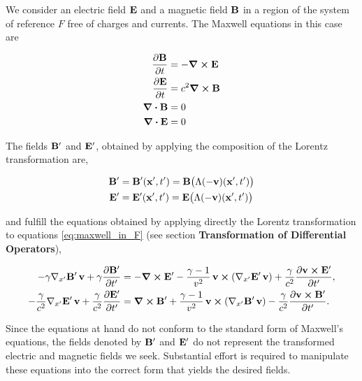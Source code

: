 \documentclass[12pt]{article}
\begin{document}
We consider an electric field $\vb{E}$ and a magnetic field $\vb{B}$ in a region of the
system of reference $F$ free of charges and currents. The Maxwell equations in this case are

\begin{equation}
    \begin{aligned}
      \pdv{\vb{B}}{t} &= -\curl \vb{E} \\
      \pdv{\vb{E}}{t} &= c^2 \curl \vb{B} \\
      \div \vb{B}     &= 0 \\
      \div \vb{E}     &= 0
    \end{aligned}
  \label{eq:maxwell_in_F}
\end{equation}

The fields $\vb{B}'$ and $\vb{E}'$, obtained by applying the composition of the Lorentz
transformation are,

\begin{align}
  \vb{B}' &= \vb{B}'(\vb{x}',t') = \vb{B}\bigl(\Lambda(-\vb{v})(\vb{x}',t')\bigr) \\
  \vb{E}' &= \vb{E}'(\vb{x}',t') = \vb{E}\bigl(\Lambda(-\vb{v})(\vb{x}',t')\bigr)
\end{align}

and fulfill the equations obtained by applying directly the Lorentz transformation to
equations \eqref{eq:maxwell_in_F} (see section \textbf{Transformation of Differential
Operators}),

\begin{equation}
  \begin{aligned}
    -\gamma\nabla_{x'}\vb{B}'\,\vb{v}
    + \gamma\pdv{\vb{B}'}{t'}
    &=
    -\curl \vb{E}'
    - \frac{\gamma-1}{v^2}\,
      \vb{v}\cross\left(\nabla_{x'}\vb{E}'\,\vb{v}\right)
    + \frac{\gamma}{c^2}
      \pdv{\vb{v}\cross\vb{E}'}{t'},
    \\
    -\frac{\gamma}{c^2}\nabla_{x'}\vb{E}'\,\vb{v}
    + \frac{\gamma}{c^2}\pdv{\vb{E}'}{t'}
    &=
    \curl \vb{B}'
    + \frac{\gamma-1}{v^2}\,
      \vb{v}\cross\left(\nabla_{x'}\vb{B}'\,\vb{v}\right)
    - \frac{\gamma}{c^2}
      \pdv{\vb{v}\cross\vb{B}'}{t'}.
  \end{aligned}
  \label{eq:maxwell_transformed}
\end{equation}

Since the equations at hand do not conform to the standard form of Maxwell's equations, the
fields denoted by $\vb{B}'$ and $\vb{E}'$ do not represent the transformed electric and
magnetic fields we seek. Substantial effort is required to manipulate these equations into the
correct form that yields the desired fields.
\end{document}
